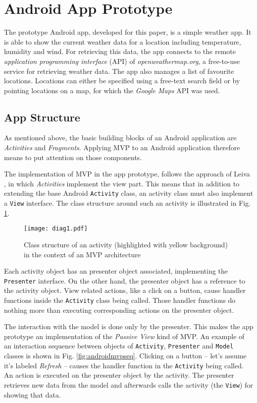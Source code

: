 
\section{Android App Prototype}

The prototype Android app, developed for this paper, is a simple weather app. It is able to show the current weather data for a location including temperature, humidity and wind. For retrieving this data, the app connects to the remote \emph{application programming interface} (API) of \emph{openweathermap.org}, a free-to-use service for retrieving weather data. The app also manages a list of favourite locations. Locations can either be specified using a free-text search field or by pointing locations on a map, for which the \emph{Google Maps} API was used.

\subsection{App Structure}

As mentioned above, the basic building blocks of an Android application are \emph{Activities} and \emph{Fragments}. Applying MVP to an Android application therefore means to put attention on those components.

The implementation of MVP in the app prototype, follows the approach of Leiva \cite{AntLeiv14}, in which \emph{Activities} implement the view part. This means that in addition to extending the base Android \texttt{Activity} class, an activity class must also implement a \texttt{View} interface. The class structure around such an activity is illustrated in Fig. \ref{fig:androidmvp}.

\begin{figure}[h]
\centering
\texttt{[image: diag1.pdf]}
\caption{Class structure of an activity (highlighted with yellow background) in the context of an MVP architecture}
\label{fig:androidmvp}
\end{figure}

Each activity object has an presenter object associated, implementing the \texttt{Presenter} interface. On the other hand, the presenter object has a reference to the activity object. View related actions, like a click on a button, cause handler functions inside the \texttt{Activity} class being called. Those handler functions do nothing more than executing corresponding actions on the presenter object.

The interaction with the model is done only by the presenter. This makes the app prototype an implementation of the \emph{Passive View} kind of MVP.
An example of an interaction sequence between objects of \texttt{Activity}, \texttt{Presenter} and \texttt{Model} classes is shown in Fig. \ref{fig:androidmvpseq}. Clicking on a button -- let's assume it's labeled \emph{Refresh} -- causes the handler function in the \texttt{Activity} being called. An action is executed on the presenter object by the activity. The presenter retrieves new data from the model and afterwards calls the activity (the \texttt{View}) for showing that data.

